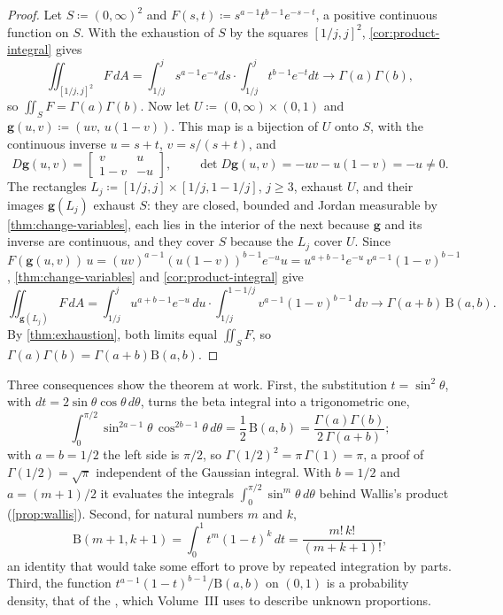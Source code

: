\begin{proof}
Let $S\coloneqq(0,\infty)^2$ and $F(s,t)\coloneqq s^{a-1}t^{b-1}e^{-s-t}$, a positive continuous function on $S$. With the exhaustion of $S$ by the squares $[1/j,j]^2$, \cref{cor:product-integral} gives
\[
\iint_{[1/j,j]^2}F\,dA=\int_{1/j}^js^{a-1}e^{-s}ds\cdot\int_{1/j}^jt^{b-1}e^{-t}dt\to\Gamma(a)\Gamma(b),
\]
so $\iint_SF=\Gamma(a)\Gamma(b)$. Now let $U\coloneqq(0,\infty)\times(0,1)$ and $\mathbf g(u,v)\coloneqq(uv,\,u(1-v))$. This map is a bijection of $U$ onto $S$, with the continuous inverse $u=s+t$, $v=s/(s+t)$, and
\[
D\mathbf g(u,v)=\begin{bmatrix}v&u\\1-v&-u\end{bmatrix},\qquad\det D\mathbf g(u,v)=-uv-u(1-v)=-u\ne0 .
\]
The rectangles $L_j\coloneqq[1/j,j]\times[1/j,1-1/j]$, $j\ge3$, exhaust $U$, and their images $\mathbf g(L_j)$ exhaust $S$: they are closed, bounded and Jordan measurable by \cref{thm:change-variables}, each lies in the interior of the next because $\mathbf g$ and its inverse are continuous, and they cover $S$ because the $L_j$ cover $U$. Since $F(\mathbf g(u,v))\,u=(uv)^{a-1}(u(1-v))^{b-1}e^{-u}u=u^{a+b-1}e^{-u}\,v^{a-1}(1-v)^{b-1}$, \cref{thm:change-variables} and \cref{cor:product-integral} give
\[
\iint_{\mathbf g(L_j)}F\,dA=\int_{1/j}^ju^{a+b-1}e^{-u}\,du\cdot\int_{1/j}^{1-1/j}v^{a-1}(1-v)^{b-1}\,dv\to\Gamma(a+b)\,\mathrm B(a,b).
\]
By \cref{thm:exhaustion}, both limits equal $\iint_SF$, so $\Gamma(a)\Gamma(b)=\Gamma(a+b)\mathrm B(a,b)$.
\end{proof}

Three consequences show the theorem at work. First, the substitution $t=\sin^2\theta$, with $dt=2\sin\theta\cos\theta\,d\theta$, turns the beta integral into a trigonometric one,
\[
\int_0^{\pi/2}\sin^{2a-1}\theta\,\cos^{2b-1}\theta\,d\theta=\frac12\,\mathrm B(a,b)=\frac{\Gamma(a)\Gamma(b)}{2\,\Gamma(a+b)} ;
\]
with $a=b=1/2$ the left side is $\pi/2$, so $\Gamma(1/2)^2=\pi\,\Gamma(1)=\pi$, a proof of $\Gamma(1/2)=\sqrt\pi$ independent of the Gaussian integral. With $b=1/2$ and $a=(m+1)/2$ it evaluates the integrals $\int_0^{\pi/2}\sin^m\theta\,d\theta$ behind Wallis's product (\cref{prop:wallis}). Second, for natural numbers $m$ and $k$,
\[
\mathrm B(m+1,k+1)=\int_0^1t^m(1-t)^k\,dt=\frac{m!\,k!}{(m+k+1)!},
\]
an identity that would take some effort to prove by repeated integration by parts. Third, the function $t^{a-1}(1-t)^{b-1}/\mathrm B(a,b)$ on $(0,1)$ is a probability density, that of the , which Volume~III uses to describe unknown proportions.

